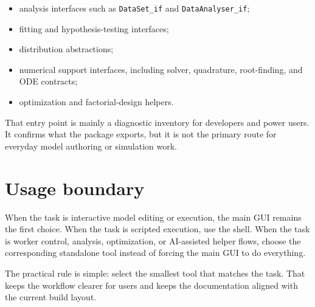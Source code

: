 \begin{itemize}
\item analysis interfaces such as \texttt{DataSet\_if} and \texttt{DataAnalyser\_if};
\item fitting and hypothesis-testing interfaces;
\item distribution abstractions;
\item numerical support interfaces, including solver, quadrature, root-finding,
and ODE contracts;
\item optimization and factorial-design helpers.
\end{itemize}

That entry point is mainly a diagnostic inventory for developers and power
users. It confirms what the package exports, but it is not the primary route
for everyday model authoring or simulation work.

\section{Usage boundary}

When the task is interactive model editing or execution, the main GUI remains
the first choice. When the task is scripted execution, use the shell. When the
task is worker control, analysis, optimization, or AI-assisted helper flows,
choose the corresponding standalone tool instead of forcing the main GUI to do
everything.

The practical rule is simple: select the smallest tool that matches the task.
That keeps the workflow clearer for users and keeps the documentation aligned
with the current build layout.
